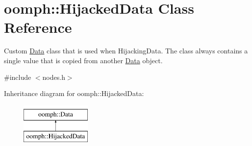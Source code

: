 \hypertarget{classoomph_1_1HijackedData}{}\section{oomph\+:\+:Hijacked\+Data Class Reference}
\label{classoomph_1_1HijackedData}


Custom \hyperlink{classoomph_1_1Data}{Data} class that is used when Hijacking\+Data. The class always contains a single value that is copied from another \hyperlink{classoomph_1_1Data}{Data} object.  




{\ttfamily \#include $<$nodes.\+h$>$}

Inheritance diagram for oomph\+:\+:Hijacked\+Data\+:\begin{figure}[H]
\begin{center}
\leavevmode
\includegraphics[height=2.000000cm]{classoomph_1_1HijackedData}
\end{center}
\end{figure}
